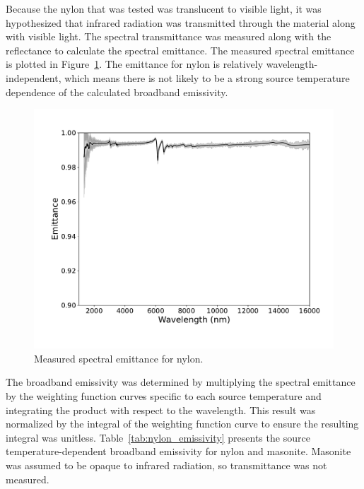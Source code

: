 \documentclass[12pt,oneside]{book}
\begin{document}
Because the nylon that was tested was translucent to visible light, it was hypothesized that infrared radiation was transmitted through the material along with visible light. The spectral transmittance was measured along with the reflectance to calculate the spectral emittance. The measured spectral emittance is plotted in Figure~\ref{fig:nylon_emittance}. The emittance for nylon is relatively wavelength-independent, which means there is not likely to be a strong source temperature dependence of the calculated broadband emissivity. 

\begin{figure}[!ht]
\centering
\includegraphics[width=.75\columnwidth]{Figures/Nylon_Measured.pdf}
\caption[Measured Spectral Emittance for Nylon]{Measured spectral emittance for nylon.}
\label{fig:nylon_emittance}
\end{figure}

The broadband emissivity was determined by multiplying the spectral emittance by the weighting function curves specific to each source temperature and integrating the product with respect to the wavelength. This result was normalized by the integral of the weighting function curve to ensure the resulting integral was unitless. Table~\ref{tab:nylon_emissivity} presents the source temperature-dependent broadband emissivity for nylon and masonite. Masonite was assumed to be opaque to infrared radiation, so transmittance was not measured.
\end{document}
